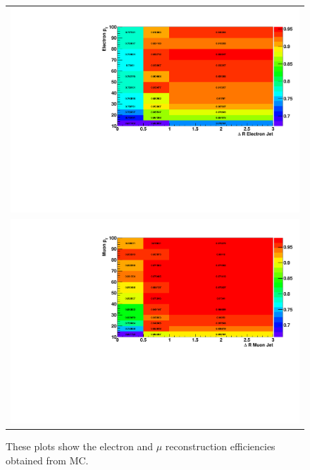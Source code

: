 \begin{figure}[tbhn]
\begin{center}
\begin{tabular}{c}
\includegraphics[width=.90\textwidth]{lostlepton/plots/Elec_Reco.pdf}\\
\includegraphics[width=.90\textwidth]{lostlepton/plots/Muon_Reco.pdf}\\
\end{tabular}
\end{center}
\caption{These plots show the electron and $\mu$ reconstruction efficiencies obtained from MC.
}
\label{fig:reco_eff}
\end{figure}
\clearpage

